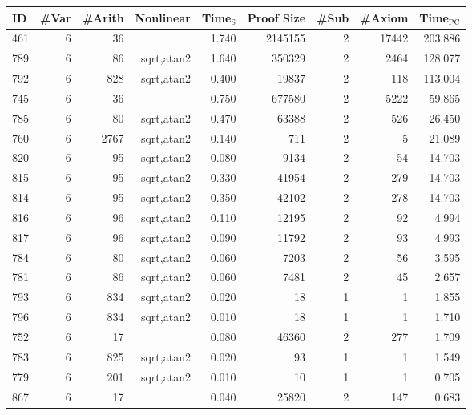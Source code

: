 \begin{table}
  \begin{center}
\begin{tabular}{|l||r|r|r||r|r|r|r|r|}
\hline
ID & \#Var & \#Arith & Nonlinear & Time$_{\text{S}}$ & Proof Size & \#Sub & \#Axiom & Time$_{\text{PC}}$ \\
\hline
\hline
461 & 6 & 36 &  & 1.740 & 2145155 & 2 & 17442 & 203.886 \\
789 & 6 & 86 & sqrt,atan2 & 1.640 & 350329 & 2 & 2464 & 128.077 \\
792 & 6 & 828 & sqrt,atan2 & 0.400 & 19837 & 2 & 118 & 113.004 \\
745 & 6 & 36 &  & 0.750 & 677580 & 2 & 5222 & 59.865 \\
785 & 6 & 80 & sqrt,atan2 & 0.470 & 63388 & 2 & 526 & 26.450 \\
760 & 6 & 2767 & sqrt,atan2 & 0.140 & 711 & 2 & 5 & 21.089 \\
820 & 6 & 95 & sqrt,atan2 & 0.080 & 9134 & 2 & 54 & 14.703 \\
815 & 6 & 95 & sqrt,atan2 & 0.330 & 41954 & 2 & 279 & 14.703 \\
814 & 6 & 95 & sqrt,atan2 & 0.350 & 42102 & 2 & 278 & 14.703 \\
816 & 6 & 96 & sqrt,atan2 & 0.110 & 12195 & 2 & 92 & 4.994 \\
817 & 6 & 96 & sqrt,atan2 & 0.090 & 11792 & 2 & 93 & 4.993 \\
784 & 6 & 80 & sqrt,atan2 & 0.060 & 7203 & 2 & 56 & 3.595 \\
781 & 6 & 86 & sqrt,atan2 & 0.060 & 7481 & 2 & 45 & 2.657 \\
793 & 6 & 834 & sqrt,atan2 & 0.020 & 18 & 1 & 1 & 1.855 \\
796 & 6 & 834 & sqrt,atan2 & 0.010 & 18 & 1 & 1 & 1.710 \\
752 & 6 & 17 &  & 0.080 & 46360 & 2 & 277 & 1.709 \\
783 & 6 & 825 &sqrt,atan2 & 0.020 & 93 & 1 & 1 & 1.549 \\
779 & 6 & 201 & sqrt,atan2 & 0.010 & 10 & 1 & 1 & 0.705 \\
867 & 6 & 17 &  & 0.040 & 25820 & 2 & 147 & 0.683 \\

\end{tabular}
\end{center}
\end{table}
